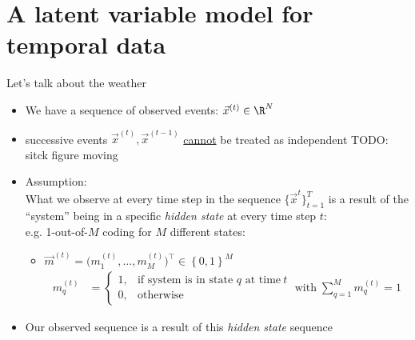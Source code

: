 \section{A latent variable model for temporal data}


\begin{frame}{Let's talk about the weather}



\end{frame}

\begin{frame}

\begin{itemize}
\item We have a sequence of observed events: $\vec x^{(t)} \in \R^N$
\item successive events $\vec x^{(t)}, \vec x^{(t-1)}$ \underline{cannot} be treated as independent TODO: sitck figure moving
\item Assumption:\\
What we observe at every time step in the sequence $\{ \vec x^{t}\}_{t=1}^{T}$ is a result of the ``system'' being in a specific \emph{hidden state} at every time step $t$:\\
e.g. 1-out-of-$M$ coding for $M$ different states:
\begin{itemize} 
\item $\vec{m}^{(t)} = \big( m_1^{(t)}, \dots, m_M^{(t)} \big)^\top \in \left\{ 0, 1 \right\}^M$ \\
		\begin{align}
		m_q^{(t)} &= 
		\begin{cases}
		1, & \text{if system is in state } q \text{ at time}~t\\
		0, & \text{otherwise}
		\end{cases}
		\;\text{with} \;
		 \sum_{q=1}^{M} m_q^{(t)} = 1 
		\end{align}
\end{itemize}
\item Our observed sequence is a result of this \emph{hidden state} sequence
\end{itemize}

\end{frame}


